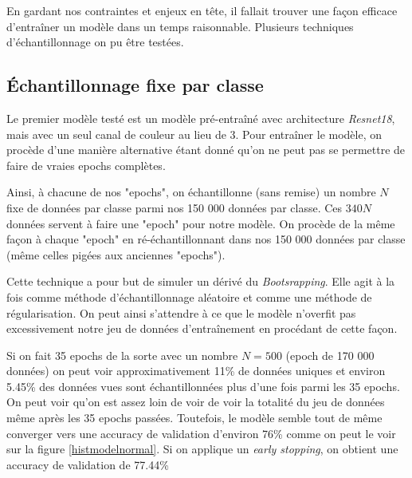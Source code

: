 En gardant nos contraintes et enjeux en tête, il fallait trouver une façon efficace d'entraîner un modèle dans un temps raisonnable. Plusieurs techniques d'échantillonnage on pu être testées.


\subsection{Échantillonnage fixe par classe}

Le premier modèle testé est un modèle pré-entraîné avec architecture \emph{Resnet18}, mais avec un seul canal de couleur au lieu de 3. Pour entraîner le modèle, on procède d'une manière alternative étant donné qu'on ne peut pas se permettre de faire de vraies epochs complètes. 



Ainsi, à chacune de nos "epochs", on échantillonne (sans remise) un nombre $N$ fixe de données par classe parmi nos 150 000 données par classe. Ces $340N$ données servent à faire une "epoch"  pour notre modèle. On procède de la même façon à chaque "epoch" en ré-échantillonnant dans nos 150 000 données par classe (même celles pigées aux anciennes "epochs").



Cette technique a pour but de simuler un dérivé du \emph{Bootsrapping}. Elle agit à la fois comme méthode d'échantillonnage aléatoire et comme une méthode de régularisation. On peut ainsi s'attendre à ce que le modèle n'overfit pas excessivement notre jeu de données d'entraînement en procédant de cette façon. 



Si on fait 35 epochs de la sorte avec un nombre $N=500$ (epoch de 170 000 données) on peut voir approximativement 11\% de données uniques et environ 5.45\% des données vues sont échantillonnées plus d'une fois parmi les 35 epochs. On peut voir qu'on est assez loin de voir de voir la totalité du jeu de données même après les 35 epochs passées. Toutefois, le modèle semble tout de même converger vers une accuracy de validation d'environ 76\% comme on peut le voir sur la figure \ref{histmodelnormal}. Si on applique un \emph{early stopping}, on obtient une accuracy de validation de 77.44\%


